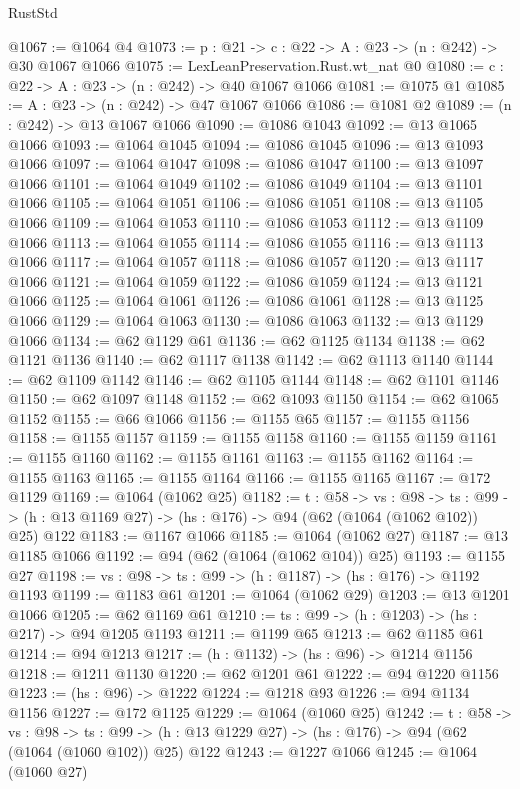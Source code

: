 \begin{lexlean}{RustStd}
\begin{coremodule}
@1067 := @1064 @4
@1073 := {p : @21} -> {c : @22} -> {A : @23} -> (n : @242) -> @30 @1067 @1066
@1075 := LexLeanPreservation.Rust.wt_nat @0
@1080 := {c : @22} -> {A : @23} -> (n : @242) -> @40 @1067 @1066
@1081 := @1075 @1
@1085 := {A : @23} -> (n : @242) -> @47 @1067 @1066
@1086 := @1081 @2
@1089 := (n : @242) -> @13 @1067 @1066
@1090 := @1086 @1043
@1092 := @13 @1065 @1066
@1093 := @1064 @1045
@1094 := @1086 @1045
@1096 := @13 @1093 @1066
@1097 := @1064 @1047
@1098 := @1086 @1047
@1100 := @13 @1097 @1066
@1101 := @1064 @1049
@1102 := @1086 @1049
@1104 := @13 @1101 @1066
@1105 := @1064 @1051
@1106 := @1086 @1051
@1108 := @13 @1105 @1066
@1109 := @1064 @1053
@1110 := @1086 @1053
@1112 := @13 @1109 @1066
@1113 := @1064 @1055
@1114 := @1086 @1055
@1116 := @13 @1113 @1066
@1117 := @1064 @1057
@1118 := @1086 @1057
@1120 := @13 @1117 @1066
@1121 := @1064 @1059
@1122 := @1086 @1059
@1124 := @13 @1121 @1066
@1125 := @1064 @1061
@1126 := @1086 @1061
@1128 := @13 @1125 @1066
@1129 := @1064 @1063
@1130 := @1086 @1063
@1132 := @13 @1129 @1066
@1134 := @62 @1129 @61
@1136 := @62 @1125 @1134
@1138 := @62 @1121 @1136
@1140 := @62 @1117 @1138
@1142 := @62 @1113 @1140
@1144 := @62 @1109 @1142
@1146 := @62 @1105 @1144
@1148 := @62 @1101 @1146
@1150 := @62 @1097 @1148
@1152 := @62 @1093 @1150
@1154 := @62 @1065 @1152
@1155 := @66 @1066
@1156 := @1155 @65
@1157 := @1155 @1156
@1158 := @1155 @1157
@1159 := @1155 @1158
@1160 := @1155 @1159
@1161 := @1155 @1160
@1162 := @1155 @1161
@1163 := @1155 @1162
@1164 := @1155 @1163
@1165 := @1155 @1164
@1166 := @1155 @1165
@1167 := @172 @1129
@1169 := @1064 (@1062 @25)
@1182 := {t : @58} ->
  {vs : @98} ->
  {ts : @99} -> (h : @13 @1169 @27) -> (hs : @176) -> @94 (@62 (@1064 (@1062 @102)) @25) @122
@1183 := @1167 @1066
@1185 := @1064 (@1062 @27)
@1187 := @13 @1185 @1066
@1192 := @94 (@62 (@1064 (@1062 @104)) @25)
@1193 := @1155 @27
@1198 := {vs : @98} -> {ts : @99} -> (h : @1187) -> (hs : @176) -> @1192 @1193
@1199 := @1183 @61
@1201 := @1064 (@1062 @29)
@1203 := @13 @1201 @1066
@1205 := @62 @1169 @61
@1210 := {ts : @99} -> (h : @1203) -> (hs : @217) -> @94 @1205 @1193
@1211 := @1199 @65
@1213 := @62 @1185 @61
@1214 := @94 @1213
@1217 := (h : @1132) -> (hs : @96) -> @1214 @1156
@1218 := @1211 @1130
@1220 := @62 @1201 @61
@1222 := @94 @1220 @1156
@1223 := (hs : @96) -> @1222
@1224 := @1218 @93
@1226 := @94 @1134 @1156
@1227 := @172 @1125
@1229 := @1064 (@1060 @25)
@1242 := {t : @58} ->
  {vs : @98} ->
  {ts : @99} -> (h : @13 @1229 @27) -> (hs : @176) -> @94 (@62 (@1064 (@1060 @102)) @25) @122
@1243 := @1227 @1066
@1245 := @1064 (@1060 @27)

\end{coremodule}
\end{lexlean}

